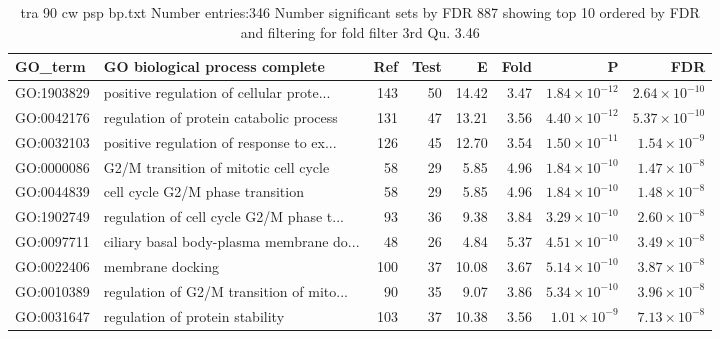\begin{table}[ht]
\centering
\begin{adjustbox}{width=\textwidth}
\begin{tabular}{llrrrrrr}
  \hline
GO\_term & GO biological process complete & Ref & Test & E & Fold & P & FDR \\ 
  \hline
GO:1903829 & positive regulation of cellular prote... & 143 & 50 & 14.42 & 3.47 & $1.84 \times 10^{-12}$ & $2.64 \times 10^{-10}$ \\ 
  GO:0042176 & regulation of protein catabolic process  & 131 & 47 & 13.21 & 3.56 & $4.40 \times 10^{-12}$ & $5.37 \times 10^{-10}$ \\ 
  GO:0032103 & positive regulation of response to ex... & 126 & 45 & 12.70 & 3.54 & $1.50 \times 10^{-11}$ & $1.54 \times 10^{-9}$ \\ 
  GO:0000086 & G2/M transition of mitotic cell cycle  & 58 & 29 & 5.85 & 4.96 & $1.84 \times 10^{-10}$ & $1.47 \times 10^{-8}$ \\ 
  GO:0044839 & cell cycle G2/M phase transition  & 58 & 29 & 5.85 & 4.96 & $1.84 \times 10^{-10}$ & $1.48 \times 10^{-8}$ \\ 
  GO:1902749 & regulation of cell cycle G2/M phase t... & 93 & 36 & 9.38 & 3.84 & $3.29 \times 10^{-10}$ & $2.60 \times 10^{-8}$ \\ 
  GO:0097711 & ciliary basal body-plasma membrane do... & 48 & 26 & 4.84 & 5.37 & $4.51 \times 10^{-10}$ & $3.49 \times 10^{-8}$ \\ 
  GO:0022406 & membrane docking  & 100 & 37 & 10.08 & 3.67 & $5.14 \times 10^{-10}$ & $3.87 \times 10^{-8}$ \\ 
  GO:0010389 & regulation of G2/M transition of mito... & 90 & 35 & 9.07 & 3.86 & $5.34 \times 10^{-10}$ & $3.96 \times 10^{-8}$ \\ 
  GO:0031647 & regulation of protein stability  & 103 & 37 & 10.38 & 3.56 & $1.01 \times 10^{-9}$ & $7.13 \times 10^{-8}$ \\ 
  \hline
\end{tabular}
\end{adjustbox}
\caption{tra 90 cw psp bp.txt Number entries:346 Number significant sets by FDR 887 showing top 10 ordered by FDR and filtering for fold filter 3rd Qu. 3.46} 
\label{tab:tra 90 cw psp bp.txt Number entries:346 Number significant sets by FDR 887 showing top 10 ordered by FDR and filtering for fold filter 3rd Qu. 3.46}
\end{table}


